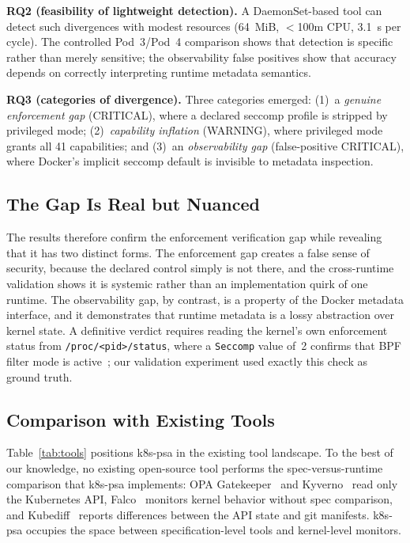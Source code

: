 \documentclass[conference]{IEEEtran}
\begin{document}
\textbf{RQ2 (feasibility of lightweight detection).} A DaemonSet-based tool can detect such divergences with modest resources (64~MiB, $<$100m CPU, 3.1~s per cycle). The controlled Pod~3/Pod~4 comparison shows that detection is specific rather than merely sensitive; the observability false positives show that accuracy depends on correctly interpreting runtime metadata semantics.

\textbf{RQ3 (categories of divergence).} Three categories emerged: (1)~a \emph{genuine enforcement gap} (CRITICAL), where a declared seccomp profile is stripped by privileged mode; (2)~\emph{capability inflation} (WARNING), where privileged mode grants all 41 capabilities; and (3)~an \emph{observability gap} (false-positive CRITICAL), where Docker's implicit seccomp default is invisible to metadata inspection.

\subsection{The Gap Is Real but Nuanced}

The results therefore confirm the enforcement verification gap while revealing that it has two distinct forms. The enforcement gap creates a false sense of security, because the declared control simply is not there, and the cross-runtime validation shows it is systemic rather than an implementation quirk of one runtime. The observability gap, by contrast, is a property of the Docker metadata interface, and it demonstrates that runtime metadata is a lossy abstraction over kernel state. A definitive verdict requires reading the kernel's own enforcement status from \texttt{/proc/<pid>/status}, where a \texttt{Seccomp} value of~2 confirms that BPF filter mode is active~\cite{kep2413}; our validation experiment used exactly this check as ground truth.

\subsection{Comparison with Existing Tools}

Table~\ref{tab:tools} positions k8s-psa in the existing tool landscape. To the best of our knowledge, no existing open-source tool performs the spec-versus-runtime comparison that k8s-psa implements: OPA Gatekeeper~\cite{gatekeeper2024} and Kyverno~\cite{kyverno2024} read only the Kubernetes API, Falco~\cite{falco2024} monitors kernel behavior without spec comparison, and Kubediff~\cite{kubediff2020} reports differences between the API state and git manifests. k8s-psa occupies the space between specification-level tools and kernel-level monitors.
\end{document}
